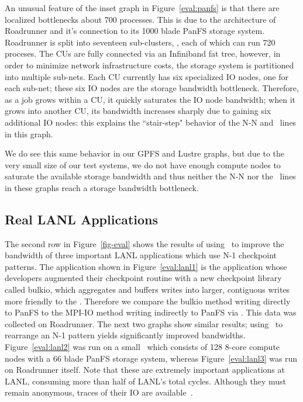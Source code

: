 An unusual feature of the inset graph in Figure~\ref{eval:panfs} is that there
are localized bottlenecks about 700 processes.  This is due to the architecture
of Roadrunner and it's connection to its 1000 blade PanFS storage system.
Roadrunner is split into seventeen sub-clusters, , each of which can
run 720 proceses.  The CUs are fully connected via an Infiniband fat tree,
however, in order to minimize network infrastructure costs, the storage system
is partitioned into multiple sub-nets. Each CU currently has six specialized IO
nodes, one for each sub-net; these six IO nodes are the storage bandwidth
bottleneck.  Therefore, as a job grows within a CU, it quickly saturates the IO
node bandwidth; when it grows into another CU, its bandwidth increases sharply
due to gaining six additional IO nodes: this explains the ``stair-step"
behavior of the N-N and \plfs\ lines in this graph. 
 
We do see this same behavior in our GPFS and Lustre graphs, but due to the
very small size of our test systems, we do not have enough compute nodes to
saturate the available storage bandwidth and thus neither the N-N nor the
\plfs\ lines in these graphs reach a storage bandwidth bottleneck. 

\subsection{Real LANL Applications}

The second row in Figure~\ref{fig-eval} shows the results of using \plfs\ to
improve the bandwidth of three important LANL applications which use N-1
checkpoint patterns. The application shown in Figure~\ref{eval:lanl1} is the
application whose developers augmented their checkpoint routine with a new
checkpoint library called bulkio, which aggregates and buffers writes into
larger, contiguous writes more friendly to the \upfs. Therefore we compare the
bulkio method writing directly to PanFS to the MPI-IO method writing indirectly
to PanFS via \plfs.  This data was collected on Roadrunner.  The next two
graphs show similar results; using \plfs\ to rearrange an N-1 pattern yields
significantly improved bandwidths.  Figure~\ref{eval:lanl2} was run on a small
\rrz\ which consists of 128 8-core compute nodes with a 66 blade PanFS storage
system, whereas Figure~\ref{eval:lanl3} was run on Roadrunner itself.  Note
that these are extremely important applications at LANL, consuming more than
half of LANL's total cycles.  Although they must remain anonymous, traces of
their IO are available~\cite{plfs-maps}.

